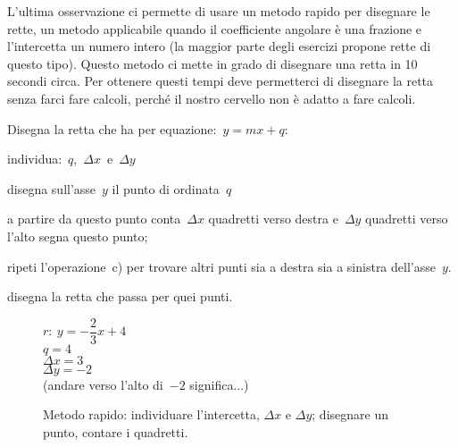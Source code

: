 L'ultima osservazione ci permette di usare un metodo rapido per disegnare 
le rette, un metodo applicabile quando il coefficiente angolare è una 
frazione e l'intercetta un numero intero (la maggior parte degli esercizi 
propone rette di questo tipo). Questo metodo ci mette in grado di disegnare 
una retta in 10 secondi circa. Per ottenere questi tempi deve permetterci di 
disegnare la retta senza farci fare calcoli, perché il nostro cervello non è 
adatto a fare calcoli.

\begin{procedura}
 Disegna la retta che ha per equazione:~\(y=mx+q\):
 \begin{enumeratea}
  \item individua:~\(q\),~\(\Delta x\)~e~\(\Delta y\)
  \item disegna sull'asse~\(y\) il punto di ordinata~\(q\)
  \item a partire da questo punto conta~\(\Delta x\) quadretti verso destra
   e~\(\Delta y\) quadretti verso l'alto segna questo punto;
  \item ripeti l'operazione~c) per trovare altri punti sia a destra sia
   a sinistra dell'asse~\(y\).
  \item disegna la retta che passa per quei punti.
 \end{enumeratea}
\end{procedura}

\begin{inaccessibleblock}
 \begin{figure}[h]
\centering \hspace{-5mm}
 \begin{minipage}[]{.40\textwidth}
  \begin{center}
   \(r:~y = - \dfrac{2}{3}x + 4\)\\[.5em]

   \(q = 4\)\\[.5em]

   \(\Delta x = 3\)\\[.5em]

   \(\Delta y = -2\)\\[.5em]
   
   (andare verso l'alto di~\(-2\) significa...)
  \end{center}
 \end{minipage}
 \begin{minipage}[]{.60\textwidth}
   \centering \metodorapido %
 \end{minipage}
  \caption{Metodo rapido: individuare l'intercetta, 
\(\Delta x\) e \(\Delta y\); disegnare un punto, contare i quadretti.} 
\label{fig:metodorapido}
\end{figure}
\end{inaccessibleblock}

